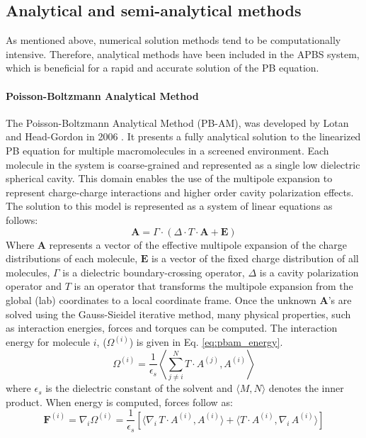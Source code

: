 \documentclass[11pt,titlepage]{article}
\begin{document}
\subsection{Analytical and semi-analytical methods}
As mentioned above, numerical solution methods tend to be computationally intensive. Therefore, analytical methods have been included in the APBS system, which is beneficial for a rapid and accurate solution of the PB equation.

\paragraph{Poisson-Boltzmann Analytical Method}
The Poisson-Boltzmann Analytical Method (PB-AM), was developed by Lotan and Head-Gordon in 2006 \cite{lotan2006}. It presents a fully analytical solution to the linearized PB equation for multiple macromolecules in a screened environment. Each molecule in the system is coarse-grained and represented as a single low dielectric spherical cavity. This domain enables the use of the multipole expansion to represent charge-charge interactions and higher order cavity polarization effects. The solution to this model is represented as a system of linear equations as follows:
%
\begin{equation}\label{eq:pbam_solve}
\mathbf{A} = \Gamma \cdot (\Delta \cdot T \cdot \mathbf{A} + \mathbf{E})
\end{equation}
%
Where \(\mathbf{A}\) represents a vector of the effective multipole expansion of the charge distributions of each molecule, \(\mathbf{E}\) is a vector of the fixed charge distribution of all molecules, \(\Gamma\) is a dielectric boundary-crossing operator, \(\Delta\) is a cavity polarization operator and \(T\) is an operator that transforms the multipole expansion from the global (lab) coordinates to a local coordinate frame. Once the unknown \textbf{A}'s are solved using the Gauss-Sieidel iterative method, many physical properties, such as interaction energies, forces and torques can be computed. The interaction energy for molecule \(i\), ($\Omega^{(i)}$) is given in Eq. \ref{eq:pbam_energy}.
%
\begin{equation}\label{eq:pbam_energy}
\Omega^{(i)}=\frac{1}{\epsilon_s} \left \langle \sum_{j \ne i}^N  T \cdot A^{(j) } ,  A^{(i) } \right \rangle 
\end{equation}
%
where $\epsilon_s$ is the dielectric constant of the solvent and $\langle  M, N \rangle$ denotes the inner product. When energy is computed, forces follow as:
%
\begin{equation}\label{eq:pbam_force}
\textbf{F}^{(i)} = \nabla_i \Omega^{(i)}=\frac{1}{\epsilon_s} [ \langle \nabla_i \,T \cdot A^{(i) } ,  A^{(i) } \rangle +  \langle T \cdot A^{(i) } ,   \nabla_i \, A^{(i) } \rangle ]
\end{equation}
\end{document}
